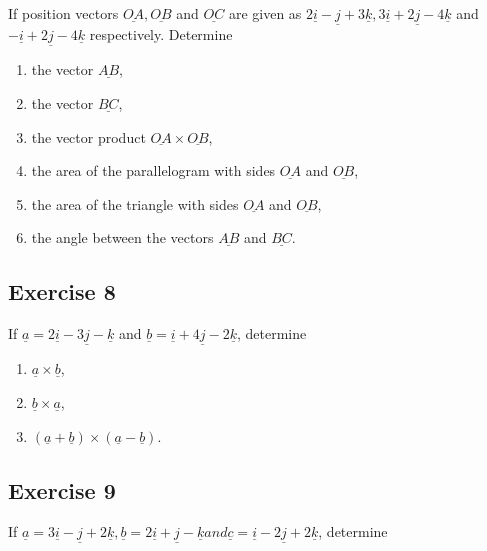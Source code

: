 \documentclass[
  11pt,
  oneside]{book}
\providecommand{\tightlist}{%
  \setlength{\itemsep}{0pt}\setlength{\parskip}{0pt}}
\newcommand{\slide}{}
\theoremstyle{definition}
\theoremstyle{definition}
\theoremstyle{definition}
\theoremstyle{definition}
\theoremstyle{remark}
\begin{document}
If position vectors \(\underline{OA}, \underline{OB}\) and \(\underline{OC}\) are given as \(2\underline{i} - \underline{j} + 3\underline{k}, 3\underline{i} + 2\underline{j} - 4\underline{k}\) and \(-\underline{i} + 2\underline{j} - 4\underline{k}\) respectively. Determine

\begin{enumerate}
\def\labelenumi{\arabic{enumi}.}
\tightlist
\item
  the vector \(\underline{AB}\),
\item
  the vector \(\underline{BC}\),
\item
  the vector product \(\underline{OA} \times \underline{OB}\),
\item
  the area of the parallelogram with sides \(\underline{OA}\) and \(\underline{OB}\),
\item
  the area of the triangle with sides \(\underline{OA}\) and \(\underline{OB}\),
\item
  the angle between the vectors \(\underline{AB}\) and \(\underline{BC}\).
\end{enumerate}

\slide

\subsection*{Exercise 8}\label{exercise-8-2}

If \(\underline{a} = 2\underline{i} - 3\underline{j} - \underline{k}\) and \(\underline{b} = \underline{i} + 4\underline{j} - 2\underline{k}\), determine

\begin{enumerate}
\def\labelenumi{\arabic{enumi}.}
\tightlist
\item
  \(\underline{a} \times \underline{b}\),
\item
  \(\underline{b} \times \underline{a}\),
\item
  \((\underline{a} + \underline{b}) \times (\underline{a} - \underline{b})\).
\end{enumerate}

\slide

\subsection*{Exercise 9}\label{exercise-9-2}

If \(\underline{a} = 3\underline{i} - \underline{j} + 2\underline{k}, \underline{b} = 2\underline{i} + \underline{j} - \underline{k} and \underline{c} = \underline{i} - 2\underline{j} + 2\underline{k}\), determine
\end{document}

